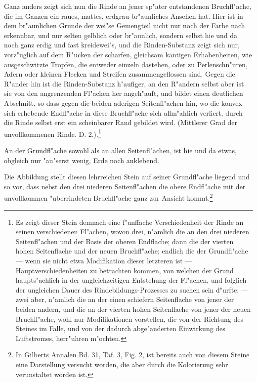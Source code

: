 \documentclass[a4paper, 11pt, oneside, german]{article}
\begin{document}
Ganz anders zeigt sich nun die Rinde an jener sp"ater entstandenen Bruchfl"ache, die im Ganzen ein raues, mattes, erdgrau-br"aunliches Ansehen hat. Hier ist in dem br"aunlichen Grunde der wei"se Gemengteil nicht nur noch der Farbe nach erkennbar, und nur selten gelblich oder br"aunlich, sondern selbst hie und da noch ganz erdig und fast kreidewei"s, und die Rinden-Substanz zeigt sich nur, vorz"uglich auf dem R"ucken der scharfen, gleichsam kantigen Erhabenheiten, wie ausgeschwitzte Tropfen, die entweder einzeln dastehen, oder zu Perlenschn"uren, Adern oder kleinen Flecken und Streifen zusammengeflossen sind. Gegen die R"ander hin ist die Rinden-Substanz h"aufiger, an den R"andern selbst aber ist sie von den angrenzenden Fl"achen her angeh"auft, und bildet einen deutlichen Abschnitt, so dass gegen die beiden aderigen Seitenfl"achen hin, wo die konvex sich erhebende Endfl"ache in diese Bruchfl"ache sich allm"ahlich verliert, durch die Rinde selbst erst ein scheinbarer Rand gebildet wird. (Mittlerer Grad der unvollkommenen Rinde. D. 2.).\footnote{Es zeigt dieser Stein demnach eine f"unffache Verschiedenheit der Rinde an seinen verschiedenen Fl"achen, wovon drei, n"amlich die an den drei niederen Seitenfl"achen und der Basis der oberen Endflache; dann die der vierten hohen Seitenflache und der neuen Bruchfl"ache; endlich die der Grundfl"ache --- wenn sie nicht etwa Modifikation dieser letzteren ist --- Hauptverschiedenheiten zu betrachten kommen, von welchen der Grund haupts"achlich in der ungleichzeitigen Entstehung der Fl"achen, und folglich der ungleichen Dauer des Rindebildungs-Prozesses zu suchen sein d"urfte: --- zwei aber, n"amlich die an der einen schiefern Seitenflache von jener der beiden andern, und die an der vierten hohen Seitenflache von jener der neuen Bruchfl"ache, wohl nur Modifikationen vorstellen, die von der Richtung des Steines im Falle, und von der dadurch abge"anderten Einwirkung des Luftstromes, herr"uhren m"ochten.} 

An der Grundfl"ache sowohl als an allen Seitenfl"achen, ist hie und da etwas, obgleich nur "au"serst wenig, Erde noch anklebend.

Die Abbildung stellt diesen lehrreichen Stein auf seiner Grundfl"ache liegend und so vor, dass nebst den drei niederen Seitenfl"achen die obere Endfl"ache mit der unvollkommen "uberrindeten Bruchfl"ache ganz zur Ansicht kommt.\footnote{In Gilberts Annalen Bd. 31, Taf. 3, Fig. 2, ist bereits auch von diesem Steine eine Darstellung versucht worden, die aber durch die Kolorierung sehr verunstaltet worden ist.}
\end{document}
